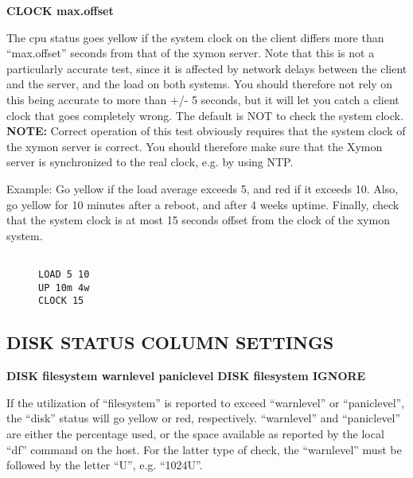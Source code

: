  


 \textbf{CLOCK max.offset}



  The cpu status goes yellow if the system clock on the client differs more than ``max.offset'' seconds from that of the xymon server. Note that this is not a particularly accurate test, since it is affected by network delays between the client and the server, and the load on both systems. You should therefore not rely on this being accurate to more than +/- 5 seconds, but it will let you catch a client clock that goes completely wrong. The default is NOT to check the system clock.  
\textbf{NOTE:}
 Correct operation of this test obviously requires that the system clock of the xymon server is correct. You should therefore make sure that the Xymon server is synchronized to the real clock, e.g. by using NTP. 


 


  Example: Go yellow if the load average exceeds 5, and red if it exceeds 10. Also, go yellow for 10 minutes after a reboot, and after 4 weeks uptime. Finally, check that the system clock is at most 15 seconds offset from the clock of the xymon system. \begin{description}
\item[]\begin{verbatim}

LOAD 5 10
UP 10m 4w
CLOCK 15

\end{verbatim}


\end{description}



 


 
\subsection{DISK STATUS COLUMN SETTINGS}


 \textbf{DISK filesystem warnlevel paniclevel}
 \textbf{DISK filesystem IGNORE}



  If the utilization of ``filesystem'' is reported to exceed ``warnlevel'' or ``paniclevel'', the ``disk'' status will go yellow or red, respectively. ``warnlevel'' and ``paniclevel'' are either the percentage used, or the space available as reported by the local ``df'' command on the host. For the latter type of check, the ``warnlevel'' must be followed by the letter ``U'', e.g. ``1024U''. 



